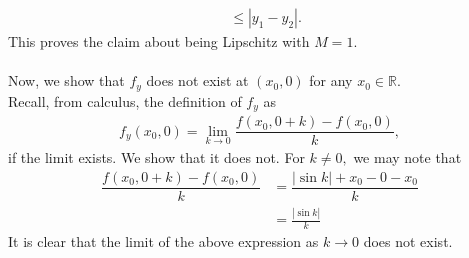 \documentclass{article}
\begin{document}
\begin{enumerate}[label = Q.\arabic*.]
\begin{align*}
		&\le |y_1 - y_2|.
	\end{align*}
	This proves the claim about being Lipschitz with $M = 1.$\\~\\
	Now, we show that $f_y$ does not exist at $(x_0, 0)$ for any $x_0 \in \mathbb{R}.$\\
	Recall, from calculus, the definition of $f_y$ as
	\begin{align*} 
		f_y(x_0, 0) = \lim_{k\to 0}\dfrac{f(x_0, 0 + k) - f(x_0, 0)}{k},
	\end{align*}
	if the limit exists. We show that it does not. For $k \neq 0,$ we may note that
	\begin{align*} 
		\dfrac{f(x_0, 0 + k) - f(x_0, 0)}{k} &= \dfrac{|\sin k| + x_0 - 0 - x_0}{k}\\
		&= \frac{|\sin k|}{k}
	\end{align*}
	It is clear that the limit of the above expression as $k \to 0$ does not exist.
\end{enumerate}
\end{document}
